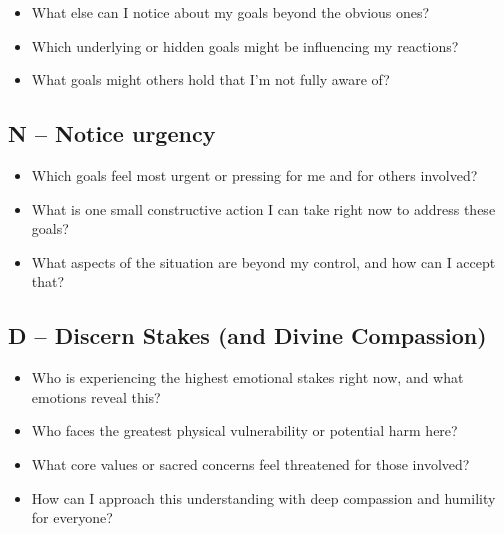 \documentclass[11pt]{article}
\begin{document}
\begin{itemize}[noitemsep]
  \item What else can I notice about my goals beyond the obvious ones?
  \item Which underlying or hidden goals might be influencing my reactions?
  \item What goals might others hold that I’m not fully aware of?
\end{itemize}
\begin{answerbox}
\vspace{3em}
\end{answerbox}

\subsection*{N – Notice urgency}

\begin{itemize}[noitemsep]
  \item Which goals feel most urgent or pressing for me and for others involved?
  \item What is one small constructive action I can take right now to address these goals?
  \item What aspects of the situation are beyond my control, and how can I accept that?
\end{itemize}
\begin{answerbox}
\vspace{3em}
\end{answerbox}

\subsection*{D – Discern Stakes (and Divine Compassion)}

\begin{itemize}[noitemsep]
  \item Who is experiencing the highest emotional stakes right now, and what emotions reveal this?
  \item Who faces the greatest physical vulnerability or potential harm here?
  \item What core values or sacred concerns feel threatened for those involved?
  \item How can I approach this understanding with deep compassion and humility for everyone?
\end{itemize}
\begin{answerbox}
\vspace{4em}
\end{answerbox}
\end{document}
